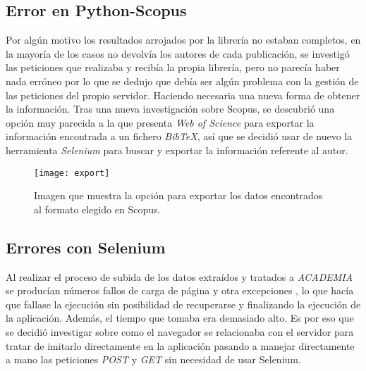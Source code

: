 \subsection{Error en Python-Scopus}
Por algún motivo los resultados arrojados por la librería no estaban completos, en la mayoría de los casos no devolvía los autores de cada publicación, se investigó las peticiones que realizaba y recibía la propia librería, pero no parecía haber nada erróneo por lo que se dedujo que debía ser algún problema con la gestión de las peticiones del propio servidor. Haciendo necesaria una nueva forma de obtener la información.
	Tras una nueva investigación sobre Scopus, se descubrió una opción muy parecida a la que presenta \emph{Web of Science} para exportar la información encontrada a un fichero \emph{BibTeX}, así que se decidió usar de nuevo la herramienta \emph{Selenium} para buscar y exportar la información referente al autor.
\begin{figure}[H]
	\centering
	\texttt{[image: export]}
	\caption{Imagen que muestra la opción para exportar los datos encontrados al formato elegido en Scopus.}
	\label{fig:export}
\end{figure}
\subsection{Errores con Selenium}
Al realizar el proceso de subida de los datos extraídos y tratados a \emph{ACADEMIA} se producían números fallos de carga de página y otra excepciones , lo que hacía que fallase la ejecución sin posibilidad de recuperarse y finalizando la ejecución de la aplicación. Además, el tiempo que tomaba era demasiado alto. Es por eso que se decidió investigar sobre como el navegador se relacionaba con el servidor para tratar de imitarlo directamente en la aplicación pasando a manejar directamente a mano las peticiones \emph{POST} y \emph{GET} sin necesidad de usar Selenium.

